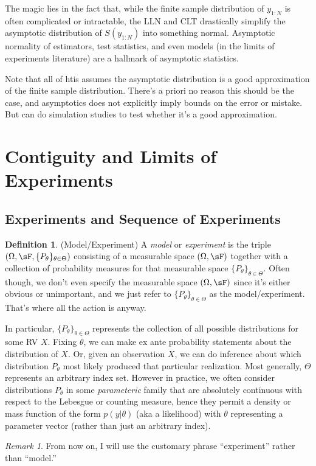 \documentclass[12pt]{article}
\theoremstyle{plain}
\theoremstyle{definition}
\newtheorem{defn}[thm]{Definition}
\theoremstyle{remark}
\newtheorem*{rmk}{Remark}
\begin{document}
The magic lies in the fact that, while the finite sample distribution of
$y_{1:N}$ is often complicated or intractable, the LLN and CLT
drastically simplify the asymptotic distribution of $S(y_{1:N})$ into
something normal. Asymptotic normality of estimators, test statistics,
and even models (in the limits of experiments literature) are a hallmark
of asymptotic statistics.

Note that all of htis assumes the asymptotic distribution is a good
approximation of the finite sample distribution.
There's a priori no reason this should be the case, and asymptotics does
not explicitly imply bounds on the error or mistake. But can do
simulation studies to test whether it's a good approximation.


\clearpage
\section{Contiguity and Limits of Experiments}

\subsection{Experiments and Sequence of Experiments}

\begin{defn}(Model/Experiment)
A \emph{model} or \emph{experiment} is the triple
$(\Omega,\sF,\{P_\theta\}_{\theta\in  \Theta})$ consisting of a measurable space
$(\Omega,\sF)$ together with a collection of probability measures for
that measurable space $\{P_\theta\}_{\theta\in  \Theta}$.
Often though, we don't even specify the measurable space $(\Omega,\sF)$
since it's either obvious or unimportant, and we just refer to
$\{P_\theta\}_{\theta\in  \Theta}$ as the model/experiment. That's where
all the action is anyway.

In particular, $\{P_\theta\}_{\theta\in  \Theta}$ represents the collection of all
possible distributions for some RV $X$.
Fixing $\theta$, we can make ex ante probability statements about the
distribution of $X$. Or, given an observation $X$, we can do inference
about which distribution $P_\theta$ most likely produced that particular
realization.
Most generally, $ \Theta$ represents an arbitrary index set.
However in practice, we often consider distributions $P_\theta$ in some
\emph{parameteric} family that are absolutely continuous with respect to
the Lebesgue or counting measure, hence they permit a density or mass
function of the form $p(y|\theta)$ (aka a likelihood) with $\theta$ representing a
parameter vector (rather than just an arbitrary index).
\end{defn}
\begin{rmk}
From now on, I will use the customary phrase ``experiment'' rather than
``model.''
\end{rmk}
\end{document}
